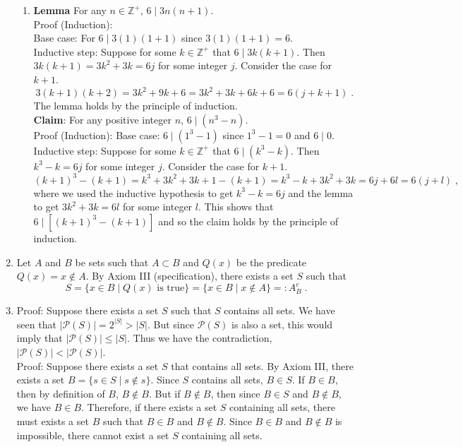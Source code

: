 \documentclass[a4paper]{article}
\begin{document}
\begin{enumerate}
\begin{enumerate}
	\item
	{\bf Lemma}
	For any $n \in \mathbb{Z}^+$, $6 \mid 3n(n+1)$. \\
	Proof (Induction): \\
	Base case: For $6 \mid 3(1)(1+1)$ since $3(1)(1+1) = 6$. \\
	Inductive step: Suppose for some $k \in \mathbb{Z}^+$ that
	$6 \mid 3k(k+1)$. Then $3k(k+1) = 3k^2 + 3k = 6j$ for some
	integer $j$. Consider the case for $k + 1$.
	$$
	3(k+1)(k+2) = 3k^2 + 9k + 6
	= 3k^2 + 3k + 6k + 6
	=6(j + k + 1) \;.
	$$
	The lemma holds by the principle of induction.\\
	
	{\bf Claim}: For any positive integer $n$,
	$6 \mid (n^3 - n)$.\\
	Proof (Induction): 
	Base case: $6 \mid (1^3 - 1)$ since $1^3 - 1 = 0$ and 
	$6 \mid 0$. \\
	Inductive step: Suppose for some $k \in \mathbb{Z}^+$ that
	$6 \mid (k^3 - k)$.
	Then $k^3 - k = 6j$ for some integer $j$.
	Consider the case for $k+1$. 
	$$
	(k+1)^3 - (k+1) = k^3 + 3k^2 + 3k + 1 - (k+1)
	= k^3 - k + 3k^2 + 3k
	= 6j + 6l
	= 6(j+l) \; ,
	$$
	where we used the inductive hypothesis to get 
	$k^3 - k = 6j$ and the lemma to get $3k^2 + 3k = 6l$ for 
	some integer $l$. 
	This shows that $6 \mid [(k+1)^3 - (k+1)]$ and so the
	claim holds by the principle of induction. 

\end{enumerate}

	
\item

Let $A$ and $B$ be sets such that $A\subset B$ and $Q(x)$ be the predicate $Q(x) = x \not\in A$. By Axiom III (specification), there exists a set $S$ such that
$$
S = \{x \in B \mid Q(x) \text{ is true} \}
= \{x \in B \mid x \not \in A\}
=: A_B^c \;.
$$

	

\item

Proof: Suppose there exists a set $S$ such that $S$ contains all sets. 
We have seen that $|\mathcal{P}(S)| = 2^{|S|} > |S|$. But since $\mathcal{P}(S)$ is also a set, this would imply that $|\mathcal{P}(S)| \leq |S|$. Thus we have the contradiction,
$|\mathcal{P}(S)| < |\mathcal{P}(S)|$. \\

Proof: Suppose there exists a set $S$ that contains all sets. By Axiom III, there exists a set $B = \{s \in S \mid s \not\in s\}$. Since $S$ contains all sets, $B \in S$. If $B \in B$, then by definition of $B$, $B \not \in B$. But if $B \not \in B$, then since $B \in S$ and $B \not \in B$, we have $B \in B$. Therefore, if there exists a set $S$ containing all sets, there must exists a set $B$ such that $B \in B$ and $B \not \in B$. Since $B \in B$ and $B \not \in B$ is impossible, there cannot exist a set $S$ containing all sets.  


\end{enumerate}
\end{document}
